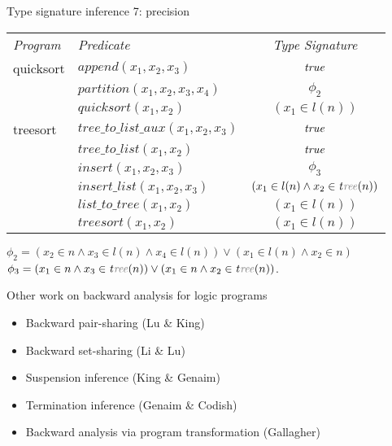 \documentclass{beamer}
\def\ttree{{\it t\color{light}ree}}
\def\pspace{\vspace*{\fill}}
\begin{document}
\begin{frame}{Type signature inference 7: precision}

\pspace

\begin{tabular}{l|l|c}
\textit{Program} & \textit{Predicate} & \textit{Type Signature} \\
\cline{1-3}
quicksort &  $append(x_1,x_2,x_3)$& ${\it true}$ \\
    & $partition(x_1,x_2,x_3,x_4)$ & $\phi_2$\\
    & $quicksort(x_1,x_2)$ & $(x_1\in {l}({n})) $\\

\cline{1-3}
treesort& $tree\_to\_{list}\_aux(x_1,x_2,x_3)$ & ${\it true}$ \\
    & $tree\_to\_{list}(x_1,x_2)$ & ${\it true}$ \\
    & $insert(x_1,x_2,x_3)$ & $\phi_3$\\
    & $insert\_{list}(x_1,x_2,x_3)$ & $(x_1\in {l}({n})\wedge x_2\in {\ttree}({n})) $\\
    & ${list}\_to\_tree(x_1,x_2)$ & $(x_1\in {l}({n})) $\\
    & $treesort(x_1,x_2)$ & $(x_1\in {l}({n})) $\\
\end{tabular}

$\phi_2=(x_2\in {n}\wedge x_3\in {l}({n})\wedge x_4\in
{l}({n}))\vee(x_1\in {l}({n})\wedge x_2\in {n}) $\\
 $\phi_3=(x_1\in
{n}\wedge x_3\in {\ttree}({n}))\vee(x_1\in {n}\wedge x_2\in
{\ttree}({n}))$.

\pspace

\end{frame}

\begin{frame}{Other work on backward analysis for logic programs}
\vspace{\fill}

\begin{itemize}
    \item Backward pair-sharing (Lu \& King)
    \item Backward set-sharing (Li \& Lu)
    \item Suspension inference (King \& Genaim)
    \item Termination inference (Genaim \& Codish)
    \item Backward analysis via program transformation (Gallagher)
\end{itemize}

\vspace{\fill}
\end{frame}
\end{document}
